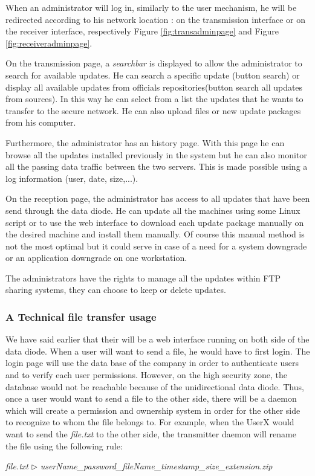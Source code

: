 \documentclass[a4paper,10pt]{article}
\begin{document}
When an administrator will log in, similarly to the user mechanism, he will be redirected according to his network location : on the transmission interface or on the receiver interface, respectively Figure \ref{fig:transadminpage} and Figure \ref{fig:receiveradminpage}.

On the transmission page, a \textit{searchbar} is displayed to allow the administrator to search for available updates. He can search a specific update (button search) or display all available updates from officials repositories(button search all updates from sources). In this way he can select from a list the updates that he wants to transfer to the secure network. He can also upload files or new update packages from his computer. 

Furthermore, the administrator has an history page. With this page he can browse all the updates installed previously in the system  but he can also monitor all the passing data traffic between the two servers. This is made possible using a log information (user, date, size,...).

On the reception page, the administrator has access to all updates that have been send through the data diode. He can update all the machines using some Linux script or to use the web interface to download each update package manually on the desired machine and install them manually. Of course this manual method is not the most optimal but it could serve in case of a need for a system downgrade or an application downgrade on one workstation.

The administrators have the rights to manage all the updates within FTP sharing systems, they can choose to keep or delete updates.

\subsubsection{A Technical file transfer usage}
We have said earlier that their will be a web interface running on both side of the data diode. When a user will want to send a file, he would have to first login. The login page will use the data base of the company in order to authenticate users and to verify each user permissions. However, on the high security zone, the database would not be reachable because of the unidirectional data diode. Thus, once a user would want to send a file to the other side, there will be a daemon which will create a permission and ownership system in order for the other side to recognize to whom the file belongs to. For example, when the UserX would want to send the \emph{file.txt} to the other side, the transmitter daemon will rename the file using the following rule:
\begin{center}
\centering
\emph{file.txt} $\triangleright$ \emph{userName\_password\_fileName\_timestamp\_size\_extension.zip}
\end{center} 
\end{document}
